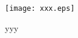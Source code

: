 \begin{figure}[!htb]
\centering
\mySetCaptionWidth
\footnotesize
\texttt{[image: xxx.eps]}
\caption{yyy}
\normalsize
\label{fig_xxx}
\end{figure}